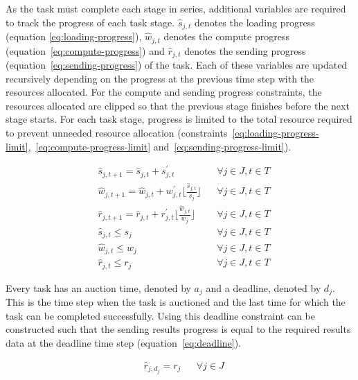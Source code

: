As the task must complete each stage in series, additional variables are required to track the progress of
each task stage. $\hat{s}_{j,t}$ denotes the loading progress (equation \eqref{eq:loading-progress}), $\hat{w}_{j,t}$
denotes the compute progress (equation~\eqref{eq:compute-progress}) and $\hat{r}_{j,t}$ denotes the sending progress
(equation~\eqref{eq:sending-progress}) of the task. Each of these variables are updated recursively depending
on the progress at the previous time step with the resources allocated. For the compute and sending progress
constraints, the resources allocated are clipped so that the previous stage finishes before the next
stage starts. For each task stage, progress is limited to the total resource required to prevent unneeded resource
allocation (constraints~\eqref{eq:loading-progress-limit},~\eqref{eq:compute-progress-limit}
and~\eqref{eq:sending-progress-limit}).

\begin{align}
    & \hat{s}_{j,t+1} = \hat{s}_{j,t} + s^{'}_{j,t} && \forall{j \in J, t \in T } \label{eq:loading-progress} \\
    & \hat{w}_{j,t+1} = \hat{w}_{j,t} + w^{'}_{j,t} \lfloor{\frac{\hat{s}_{j,t}}{s_j}}\rfloor && \forall{j \in J, t \in T } \label{eq:compute-progress} \\
    & \hat{r}_{j,t+1} = \hat{r}_{j,t} + r^{'}_{j,t} \lfloor{\frac{\hat{w}_{j,t}}{w_j}}\rfloor && \forall{j \in J, t \in T } \label{eq:sending-progress} \\
    & \hat{s}_{j,t} \leq s_j && \forall{j \in J, t \in T} \label{eq:loading-progress-limit} \\
    & \hat{w}_{j,t} \leq w_j && \forall{j \in J, t \in T} \label{eq:compute-progress-limit} \\
    & \hat{r}_{j,t} \leq r_j && \forall{j \in J, t \in T} \label{eq:sending-progress-limit}
\end{align}

Every task has an auction time, denoted by $a_j$ and a deadline, denoted by $d_j$. This is the time step when the task
is auctioned and the last time for which the task can be completed successfully. Using this deadline constraint can be
constructed such that the sending results progress is equal to the required results data at the deadline time step
(equation~\eqref{eq:deadline}).

\begin{align}
    & \hat{r}_{j, d_j} = r_j && \forall{j \in J} \label{eq:deadline}
\end{align}

